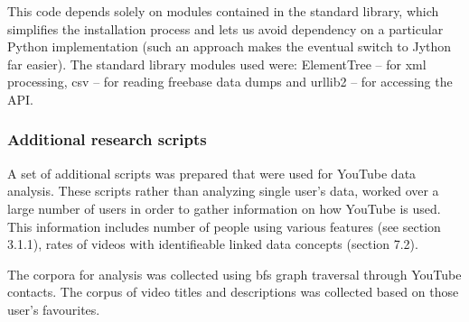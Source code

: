 \documentclass{article}
\begin{document}
This code depends solely on modules contained in the standard library, which
simplifies the installation process and lets us avoid dependency on a particular
Python implementation (such an approach makes the eventual switch to Jython far
easier). The standard library modules used were: ElementTree -- for xml
processing, csv -- for reading freebase data dumps and urllib2 -- for accessing
the API.

\subsubsection{Additional research scripts}

A set of additional scripts was prepared that were used for YouTube data
analysis. These scripts rather than analyzing single user's data, worked over a
large number of users in order to gather information on how YouTube is used.
This information includes number of people using various features (see section
3.1.1), rates of videos with identifieable linked data concepts (section 7.2).

The corpora for analysis was collected using bfs graph traversal through YouTube
contacts. The corpus of video titles and descriptions was collected based on
those user's favourites.





\end{document}

